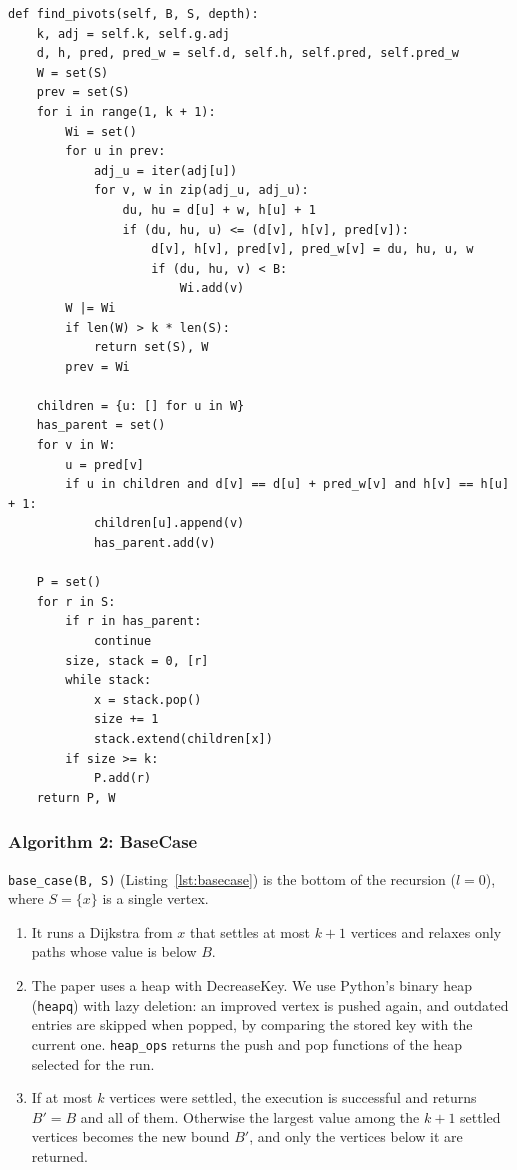 \begin{lstlisting}[style=pycode, caption={Algorithm 1, FindPivots (\texttt{duan.py}).}, label={lst:findpivots}]
def find_pivots(self, B, S, depth):
    k, adj = self.k, self.g.adj
    d, h, pred, pred_w = self.d, self.h, self.pred, self.pred_w
    W = set(S)
    prev = set(S)
    for i in range(1, k + 1):
        Wi = set()
        for u in prev:
            adj_u = iter(adj[u])
            for v, w in zip(adj_u, adj_u):
                du, hu = d[u] + w, h[u] + 1
                if (du, hu, u) <= (d[v], h[v], pred[v]):
                    d[v], h[v], pred[v], pred_w[v] = du, hu, u, w
                    if (du, hu, v) < B:
                        Wi.add(v)
        W |= Wi
        if len(W) > k * len(S):
            return set(S), W
        prev = Wi

    children = {u: [] for u in W}
    has_parent = set()
    for v in W:
        u = pred[v]
        if u in children and d[v] == d[u] + pred_w[v] and h[v] == h[u] + 1:
            children[u].append(v)
            has_parent.add(v)

    P = set()
    for r in S:
        if r in has_parent:
            continue
        size, stack = 0, [r]
        while stack:
            x = stack.pop()
            size += 1
            stack.extend(children[x])
        if size >= k:
            P.add(r)
    return P, W
\end{lstlisting}

\subsubsection{Algorithm 2: BaseCase}

\texttt{base\_case(B, S)} (Listing~\ref{lst:basecase}) is the bottom of the recursion
($l=0$), where $S=\{x\}$ is a single vertex.
\begin{enumerate}
  \item It runs a Dijkstra from $x$ that settles at most $k+1$ vertices and relaxes only
        paths whose value is below $B$.
  \item The paper uses a heap with DecreaseKey. We use Python's binary heap
        (\texttt{heapq}) with lazy deletion: an improved vertex is pushed again, and
        outdated entries are skipped when popped, by comparing the stored key with the
        current one. \texttt{heap\_ops} returns the push and pop functions of the heap
        selected for the run.
  \item If at most $k$ vertices were settled, the execution is successful and returns
        $B'=B$ and all of them. Otherwise the largest value among the $k+1$ settled
        vertices becomes the new bound $B'$, and only the vertices below it are returned.
\end{enumerate}

